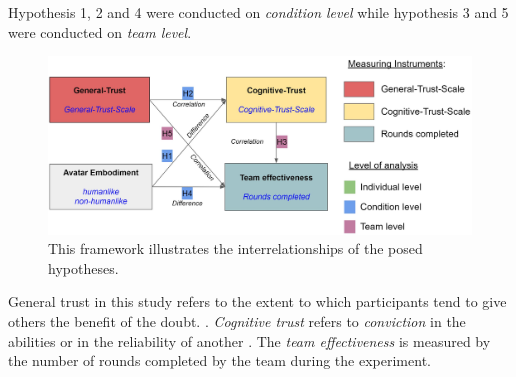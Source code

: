 \documentclass[sigchi]{acmart}
\begin{document}
Hypothesis 1, 2 and 4 were conducted on \textit{condition level} while hypothesis 3 and 5 were conducted on \textit{team level}.
\begin{figure}[H]
		\begin{footnotesize}
			\includegraphics[width=\linewidth]{Abbildungen/Versuchshypothesen_02.JPG}		
			\caption[The self-constructed framework of experimental hypotheses]{This framework illustrates the interrelationships of the posed hypotheses.}
			\label{Versuchshypothesen}
		\end{footnotesize}
	\end{figure}	

General trust in this study refers to the extent to which participants tend to give others the benefit of the doubt. \citep{mcallister1995affect}.
\textit{Cognitive trust} refers to \textit{conviction} in the abilities or in the reliability of another \citep{mcallister1995affect}.
The \textit{team effectiveness} is measured by the number of rounds completed by the team during the experiment.
\end{document}

